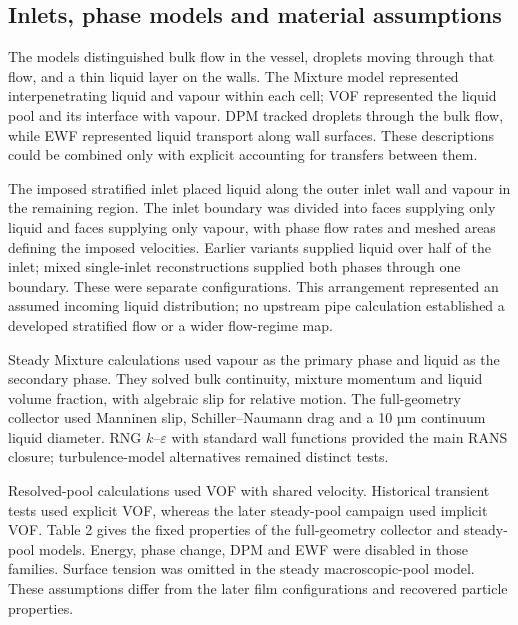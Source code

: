 \subsection{Inlets, phase models and material assumptions}

The models distinguished bulk flow in the vessel, droplets moving through that flow, and a thin liquid layer on the walls. The Mixture model represented interpenetrating liquid and vapour within each cell; VOF represented the liquid pool and its interface with vapour. DPM tracked droplets through the bulk flow, while EWF represented liquid transport along wall surfaces. These descriptions could be combined only with explicit accounting for transfers between them.

The imposed stratified inlet placed liquid along the outer inlet wall and vapour in the remaining region. The inlet boundary was divided into faces supplying only liquid and faces supplying only vapour, with phase flow rates and meshed areas defining the imposed velocities. Earlier variants supplied liquid over half of the inlet; mixed single-inlet reconstructions supplied both phases through one boundary. These were separate configurations. This arrangement represented an assumed incoming liquid distribution; no upstream pipe calculation established a developed stratified flow or a wider flow-regime map.

Steady Mixture calculations used vapour as the primary phase and liquid as the secondary phase. They solved bulk continuity, mixture momentum and liquid volume fraction, with algebraic slip for relative motion. The full-geometry collector used Manninen slip, Schiller--Naumann drag and a 10 µm continuum liquid diameter. RNG \(k\)--\(\varepsilon\) with standard wall functions provided the main RANS closure; turbulence-model alternatives remained distinct tests.

Resolved-pool calculations used VOF with shared velocity. Historical transient tests used explicit VOF, whereas the later steady-pool campaign used implicit VOF. Table 2 gives the fixed properties of the full-geometry collector and steady-pool models. Energy, phase change, DPM and EWF were disabled in those families. Surface tension was omitted in the steady macroscopic-pool model. These assumptions differ from the later film configurations and recovered particle properties.

